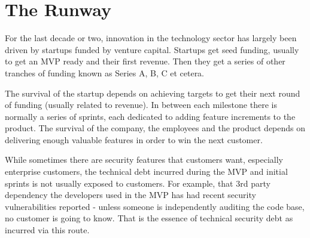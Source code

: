 \documentclass{article}
\begin{document}
\section{The Runway}
For the last decade or two, innovation in the technology sector has largely been driven by startups funded by venture capital. Startups get seed funding, usually to get an MVP ready and their first revenue.  Then they get a series of other tranches of funding known as Series A, B, C et cetera.
\par
The survival of the startup depends on achieving targets to get their next round of funding (usually related to revenue). In between each milestone there is normally a series of sprints, each dedicated to adding feature increments to the product. The survival of the company, the employees and the product depends on delivering enough valuable features in order to win the next customer.
\par
While sometimes there are security features that customers want, especially enterprise customers, the technical debt incurred during the MVP and initial sprints is not usually exposed to customers. For example, that 3rd party dependency the developers used in the MVP has had recent security vulnerabilities reported - unless someone is independently auditing the code base, no customer is going to know. That is the essence of technical security debt as incurred via this route.
\par
\end{document}
